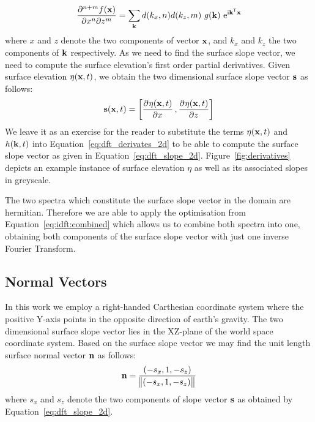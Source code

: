 \begin{equation}
\label{eq:dft_derivates_2d}
 \dmd{f(\mvec{x})}{n+m}{x}{n}{z}{m} = \sum_{\mvec{k}}d(k_{x}, n)d(k_{z}, m)~g(\mvec{k})~\mathrm{e}^{\mathrm{i}\transpose{\mvec{k}}\mvec{x}}
\end{equation}
where $x$ and $z$ denote the two components of vector $\mathbf{x}$, and $k_x$ and $k_z$ 
the two components of \wavevector $\mathbf{k}$ respectively.
As we need to find the surface slope vector, we need to compute 
the surface elevation's first order partial derivatives. Given surface 
elevation $\eta(\mathbf{x},t)$, we obtain the two dimensional surface slope 
vector $\mathbf{s}$ as follows:
\begin{equation}
\label{eq:dft_slope_2d}
 \mvec{s}(\mvec{x},t) = \left[\dpd{\eta(\mvec{x},t)}{x}, \dpd{\eta(\mvec{x},t)}{z}\right]
\end{equation}
We leave it as an exercise for the reader to substitute the terms $\eta(\mathbf{x},t)$
and $h(\mathbf{k},t)$ into Equation~\ref{eq:dft_derivates_2d} to be able to
compute the surface slope vector as given in Equation~\ref{eq:dft_slope_2d}.
Figure~\ref{fig:derivatives} depicts an example instance of surface 
elevation $\eta$ as well as its associated slopes in greyscale.

The two spectra which constitute the surface slope vector in the \wavevector domain
are hermitian. Therefore we are able to apply the optimisation from
Equation~\ref{eq:idft:combined} which allows us to combine both spectra into one,
obtaining both components of the surface slope vector with just one inverse Fourier Transform.
%
\subsection{Normal Vectors}
%
In this work we employ a right-handed Carthesian coordinate system where the positive
Y-axis points in the opposite direction of earth's gravity.
The two dimensional surface slope vector lies in the XZ-plane of the world space
coordinate system. Based on the surface slope vector we may find the unit
length surface normal vector $\mathbf{n}$ as follows:
\begin{equation*}
 \mathbf{n} = \frac{(-s_x, 1, -s_z)}{\norm{(-s_x, 1, -s_z)}}
\end{equation*}
where $s_x$ and $s_z$ denote the two components of slope vector $\mathbf{s}$
as obtained by Equation~\ref{eq:dft_slope_2d}.
%

